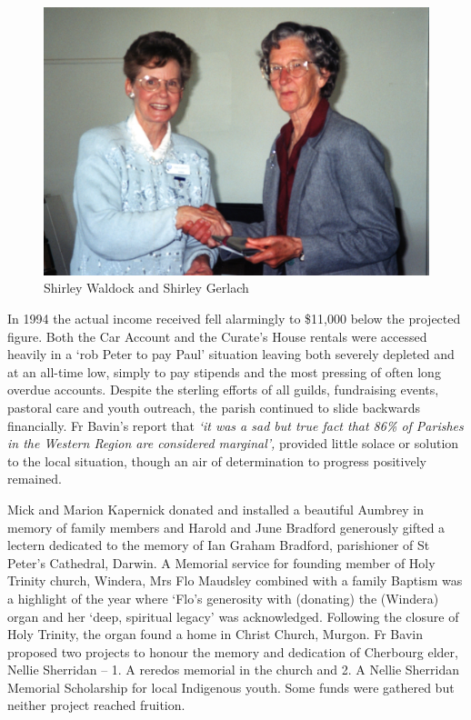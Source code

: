\begin{figure}
\begin{center}
\includegraphics[width=1.\linewidth,center]{../images/waldockGerlach.jpg}
\caption{Shirley Waldock and Shirley Gerlach}
\end{center}
\end{figure}




In 1994 the actual income received fell alarmingly to \$11,000 below the projected figure. Both the Car Account and the Curate's House rentals were accessed heavily in a `rob Peter to pay Paul' situation leaving both severely depleted and at an all-time low, simply to pay stipends and the most pressing of often long overdue accounts. Despite the sterling efforts of all guilds, fundraising events, pastoral care and youth outreach, the parish continued to slide backwards financially. Fr Bavin's report that \emph{`it was a sad but true fact that 86\% of Parishes in the Western Region are considered marginal',} provided little solace or solution to the local situation, though an air of determination to progress positively remained.



Mick and Marion Kapernick donated and installed a beautiful Aumbrey in memory of family members and Harold and June Bradford generously gifted a lectern dedicated to the memory of Ian Graham Bradford, parishioner of St Peter's Cathedral, Darwin. A Memorial service for founding member of Holy Trinity church, Windera, Mrs Flo Maudsley combined with a family Baptism was a highlight of the year where `Flo's generosity with (donating) the (Windera) organ and her `deep, spiritual legacy' was acknowledged. Following the closure of Holy Trinity, the organ found a home in Christ Church, Murgon. Fr Bavin proposed two projects to honour the memory and dedication of Cherbourg elder, Nellie Sherridan -- 1. A reredos memorial in the church and 2. A Nellie Sherridan Memorial Scholarship for local Indigenous youth. Some funds were gathered but neither project reached fruition.



